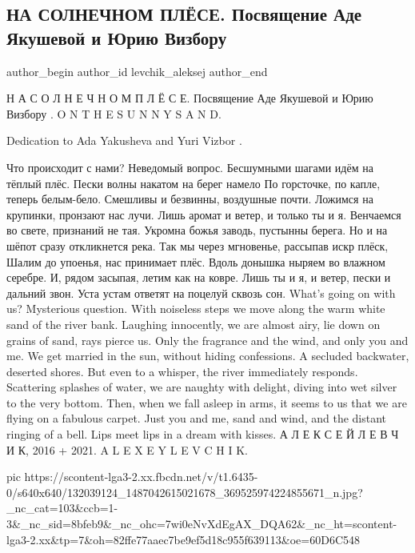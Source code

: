  
 
 
 
 
 
\subsection{НА СОЛНЕЧНОМ ПЛЁСЕ. Посвящение Аде Якушевой и Юрию Визбору}
\label{sec:17_06_2021.fb.levchik_aleksej.1.na_solnechnom_plese}
\ifcmt
 author_begin
   author_id levchik_aleksej
 author_end
\fi

\obeycr
Н А   С О Л Н Е Ч Н О М   П Л Ё С Е.  
Посвящение Аде Якушевой и Юрию Визбору .
O N   T H E   S U N N Y   S A N D.  

Dedication to Ada Yakusheva and Yuri Vizbor .

Что происходит с нами?            Неведомый вопрос. 
Бесшумными шагами          идём на тёплый плёс. 
Пески волны накатом                на берег намело 
По горсточке, по капле,      теперь белым-бело. 
Смешливы и безвинны,       воздушные почти. 
Ложимся на крупинки,      пронзают нас лучи. 
Лишь аромат и ветер,               и только ты и я. 
Венчаемся во свете,              признаний не тая. 
Укромна божья заводь,         пустынны берега. 
Но и на шёпот сразу                откликнется река. 
Так мы через мгновенье, рассыпав искр плёск, 
Шалим до упоенья,                нас принимает плёс. 
Вдоль донышка ныряем      во влажном серебре. 
И, рядом засыпая,                      летим как на ковре. 
Лишь ты и я, и ветер,               пески и дальний звон. 
Уста устам ответят                  на поцелуй сквозь сон. 
What's going on with us? Mysterious question. With noiseless steps we 
move along the warm white sand of the river bank.  Laughing innocently, 
we are almost airy, lie down on grains of sand, rays pierce us.     Only the 
fragrance and the wind, and only you and me.  We get married in the sun, 
without hiding confessions. A secluded backwater, deserted shores. But 
even to a whisper, the river immediately responds.  Scattering splashes 
of water, we are naughty with delight,   diving into wet silver to the very 
bottom.  Then, when we fall asleep in arms, it seems to us that we are 
flying on a fabulous carpet. Just you and me, sand and wind, and the 
distant ringing of a bell.            Lips meet lips in a dream with kisses.
А Л Е К С Е Й   Л Е В Ч И К,   2016 + 2021. A L E X E Y   L E V C H I K.
\restorecr

\ifcmt
  pic https://scontent-lga3-2.xx.fbcdn.net/v/t1.6435-0/s640x640/132039124_1487042615021678_369525974224855671_n.jpg?_nc_cat=103&ccb=1-3&_nc_sid=8bfeb9&_nc_ohc=7wi0eNvXdEgAX_DQA62&_nc_ht=scontent-lga3-2.xx&tp=7&oh=82ffe77aaec7be9ef5d18c955f639113&oe=60D6C548
\fi
